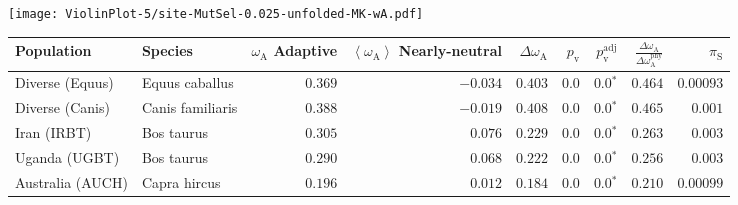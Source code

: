 \begin{center}
\texttt{[image: ViolinPlot-5/site-MutSel-0.025-unfolded-MK-wA.pdf]} 
\begin{adjustbox}{width = 1\textwidth}
\begin{tabular}{|l|l|r|r|r|r|r|r|r|}
\toprule
                     Population &              Species & \specialcell{$\omega_{\mathrm{A}}$ \\ Adaptive} & \specialcell{$\left< \omega_{\mathrm{A}} \right>$ \\ Nearly-neutral} & $\Delta \omega_{\mathrm{A}} $ & $p_{\mathrm{v}}$ & $p_{\mathrm{v}}^{\mathrm{adj}}$ & $\frac{\Delta\omega_{\mathrm{A}}}{\Delta\omega_{\mathrm{A}}^{\mathrm{phy}}}$ & $\pi_{\textrm{S}}$ \\
\midrule
                Diverse (Equus) &       Equus caballus &                                        $ 0.369$ &                                           $-0.034$ &                      $ 0.403$ &            $0.0$ &                  $\bm{0.0{^*}}$ &                                           $ 0.464$ &          $0.00093$ \\
                Diverse (Canis) &     Canis familiaris &                                        $ 0.388$ &                                           $-0.019$ &                      $ 0.408$ &            $0.0$ &                  $\bm{0.0{^*}}$ &                                           $ 0.465$ &           $ 0.001$ \\
                    Iran (IRBT) &           Bos taurus &                                        $ 0.305$ &                                           $ 0.076$ &                      $ 0.229$ &            $0.0$ &                  $\bm{0.0{^*}}$ &                                           $ 0.263$ &           $ 0.003$ \\
                  Uganda (UGBT) &           Bos taurus &                                        $ 0.290$ &                                           $ 0.068$ &                      $ 0.222$ &            $0.0$ &                  $\bm{0.0{^*}}$ &                                           $ 0.256$ &           $ 0.003$ \\
               Australia (AUCH) &         Capra hircus &                                        $ 0.196$ &                                           $ 0.012$ &                      $ 0.184$ &            $0.0$ &                  $\bm{0.0{^*}}$ &                                           $ 0.210$ &          $0.00099$ \\

\end{tabular}
\end{adjustbox}
\end{center}
